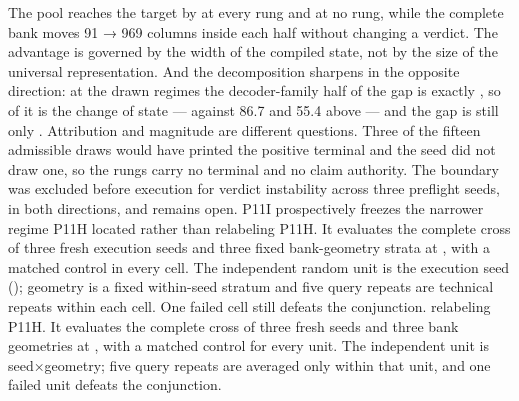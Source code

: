 {}\markdownRendererInterblockSeparator
{}The pool reaches the target by  at every  rung and at no  rung, while the complete bank moves 91 → 969 columns inside each half without changing a verdict. The advantage is governed by the width of the compiled state, not by the size of the universal representation.\markdownRendererInterblockSeparator
{}And the decomposition sharpens in the opposite direction: at the drawn regimes the decoder-family half of the  gap is exactly , so \markdownRendererStrongEmphasis{100\markdownRendererPercentSign{}} of it is the change of state — against 86.7\markdownRendererPercentSign{} and 55.4\markdownRendererPercentSign{} above — and the gap is still only . Attribution and magnitude are different questions.\markdownRendererInterblockSeparator
{}Three of the fifteen admissible draws would have printed the positive terminal and the seed did not draw one, so the  rungs carry no terminal and no claim authority. The  boundary was excluded before execution for verdict instability across three preflight seeds, in both directions, and remains open.\markdownRendererInterblockSeparator
{}
\markdownRendererSectionEnd \markdownRendererSectionBegin
{}\markdownRendererInterblockSeparator
{}P11I prospectively freezes the narrower regime P11H located rather than relabeling P11H. It evaluates the complete cross of three fresh execution seeds and three fixed bank-geometry strata at , with a matched  control in every cell. The independent random unit is the execution seed (); geometry is a fixed within-seed stratum and five query repeats are technical repeats within each cell. One failed cell still defeats the conjunction. relabeling P11H. It evaluates the complete cross of three fresh seeds and three bank geometries at , with a matched  control for every unit. The independent unit is seed×geometry; five query repeats are averaged only within that unit, and one failed unit defeats the conjunction.\markdownRendererInterblockSeparator
